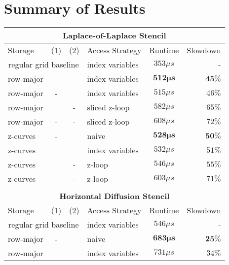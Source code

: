 \section{Summary of Results}

\begin{table}
	\begin{tabular}{l c c l c r} %
		\multicolumn{6}{c}{\textbf{Laplace-of-Laplace Stencil}} \\
		\hline
		\hline
		Storage & (1) & (2) & Access Strategy  & Runtime & Slowdown \\ %
		\hline 
		\multicolumn{3}{c}{regular grid baseline} & index variables & $353 \mu s$ & -\\
		\hline
		 row-major & \checkmark & \checkmark & index variables &  $\mathbf{512 \mu s}$ & $\mathbf{45 \%}$ \\
		 row-major & - & \checkmark & index variables & $515 \mu s$ & $46 \%$ \\
		 row-major & \checkmark & - & sliced z-loop & $582 \mu s$ & $65\%$ \\
		 row-major & - & - & sliced z-loop & $608 \mu s$ & $72 \%$ \\
		\hline
		 z-curves & - & \checkmark & naive & $\mathbf{528 \mu s}$ & $\mathbf{50 \%}$ \\
		 z-curves & \checkmark & \checkmark & index variables & $532 \mu s$ & $51 \%$ \\
		 z-curves & \checkmark & - &  z-loop & $546\mu s$ & $55 \%$ \\
		 z-curves & - & - & z-loop & $603 \mu s$ & $71 \%$ \\
		
		\hline
		\hline \\
		\multicolumn{6}{c}{\textbf{Horizontal Diffusion Stencil}} \\
		\hline
		\hline
		Storage & (1) & (2) & Access Strategy  & Runtime & Slowdown \\
		\hline
		\multicolumn{3}{c}{regular grid baseline} & index variables & $546 \mu s$ & - \\
		\hline
 		 row-major & - & \checkmark & naive & $\mathbf{683 \mu s}$ & $\mathbf{25 \%}$ \\
		
		 row-major & \checkmark & \checkmark & index variables & $731 \mu s$ & $34 \%$ \\
		

\end{tabular}
\end{table}
